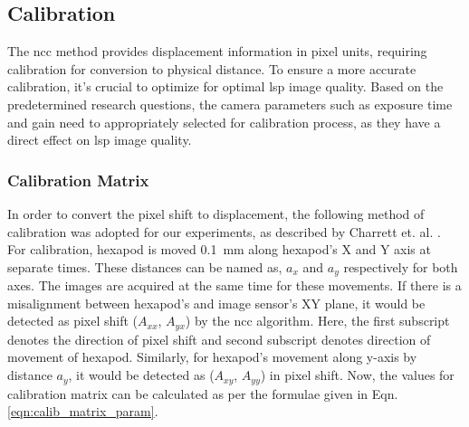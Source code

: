 
\subsection{Calibration}\label{section:calibration}
    The \gls{ncc} method provides displacement information in pixel units, requiring calibration for conversion to physical distance. To ensure a more accurate calibration, it's crucial to optimize for optimal \gls{lsp} image quality. Based on the predetermined research questions, the camera parameters such as exposure time and gain need to appropriately selected for calibration process, as they have a direct effect on \gls{lsp} image quality.

    \subsubsection*{Calibration Matrix}\label{subsection:calib_matrix}
        In order to convert the pixel shift to displacement, the following method of calibration was adopted for our experiments, as described by Charrett et. al. \cite{charrett_2018}. For calibration, hexapod is moved \SI{0.1}{\milli\meter} along hexapod's X and Y axis at separate times. These distances can be named as, $a_x$ and $a_y$ respectively for both axes. The images are acquired at the same time for these movements. If there is a misalignment between hexapod's and image sensor's XY plane, it would be detected as pixel shift ($A_{xx}$, $A_{yx}$) by the \gls{ncc} algorithm. Here, the first subscript denotes the direction of pixel shift and second subscript denotes direction of movement of hexapod. Similarly, for hexapod's movement along y-axis by distance $a_y$, it would be detected as ($A_{xy}$, $A_{yy}$) in pixel shift. Now, the values for calibration matrix can be calculated as per the formulae given in Eqn. \ref{eqn:calib_matrix_param}.

